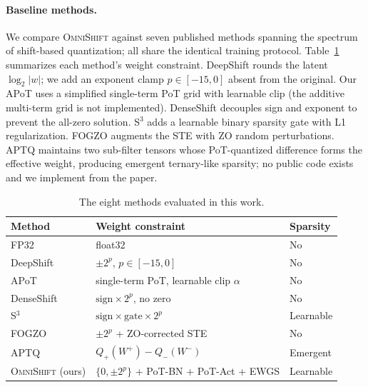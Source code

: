\documentclass[12pt]{article}
\newcommand{\omnishift}{\textsc{OmniShift}}
\begin{document}
\paragraph{Baseline methods.} We compare \omnishift{} against seven published methods spanning the spectrum of shift-based quantization; all share the identical training protocol. Table~\ref{tab:methods} summarizes each method's weight constraint. DeepShift \cite{elhoushi2021deepshift} rounds the latent $\log_2 |w|$; we add an exponent clamp $p \in [-15,0]$ absent from the original. Our APoT \cite{li2020apot} uses a simplified single-term PoT grid with learnable clip (the additive multi-term grid is not implemented). DenseShift \cite{li2023denseshift} decouples sign and exponent to prevent the all-zero solution. S$^3$ \cite{li2021s3} adds a learnable binary sparsity gate with L1 regularization. FOGZO \cite{chen2025fogzo} augments the STE with ZO random perturbations. APTQ \cite{liu2024aptq} maintains two sub-filter tensors whose PoT-quantized difference forms the effective weight, producing emergent ternary-like sparsity; no public code exists and we implement from the paper.

\begin{table}[H]
\centering
\small
\caption{The eight methods evaluated in this work.}
\label{tab:methods}
\begin{tabular}{@{}lll@{}}
\toprule
Method & Weight constraint & Sparsity \\
\midrule
FP32 & float32 & No \\
DeepShift \cite{elhoushi2021deepshift} & $\pm 2^p$, $p \in [-15,0]$ & No \\
APoT \cite{li2020apot} & single-term PoT, learnable clip $\alpha$ & No \\
DenseShift \cite{li2023denseshift} & $\text{sign} \times 2^p$, no zero & No \\
S$^3$ \cite{li2021s3} & $\text{sign} \times \text{gate} \times 2^p$ & Learnable \\
FOGZO \cite{chen2025fogzo} & $\pm 2^p$ + ZO-corrected STE & No \\
APTQ \cite{liu2024aptq} & $Q_+(W^+) - Q_-(W^-)$ & Emergent \\
\omnishift{} (ours) & $\{0,\pm 2^p\}$ + PoT-BN + PoT-Act + EWGS & Learnable \\
\bottomrule
\end{tabular}
\end{table}
\end{document}
